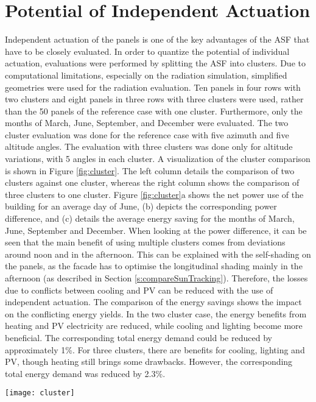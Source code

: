 \section{Potential of Independent Actuation}
	Independent actuation of the panels is one of the key advantages of the ASF that have to be closely evaluated. In order to quantize the potential of individual actuation, evaluations were performed by splitting the ASF into clusters. Due to computational limitations, especially on the radiation simulation, simplified geometries were used for the radiation evaluation. Ten panels in four rows with two clusters and eight panels in three rows with three clusters were used, rather than the 50 panels of the reference case with one cluster. Furthermore, only the months of March, June, September, and December were evaluated. The two cluster evaluation was done for the reference case with five azimuth and five altitude angles. The evaluation with three clusters was done only for altitude variations, with 5 angles in each cluster. A visualization of the cluster comparison is shown in Figure \ref{fig:cluster}. The left column details the comparison of two clusters against one cluster, whereas the right column shows the comparison of three clusters to one cluster. Figure \ref{fig:cluster}a shows the net power use of the building for an average day of June, (b) depicts the corresponding power difference, and (c) details the average energy saving for the months of March, June, September and December. When looking at the power difference, it can be seen that the main benefit of using multiple clusters comes from deviations around noon and in the afternoon. This can be explained with the self-shading on the panels, as the facade has to optimise the longitudinal shading mainly in the afternoon (as described in Section \ref{s:compareSunTracking}). Therefore, the losses due to conflicts between cooling and PV can be reduced with the use of independent actuation. The comparison of the energy savings shows the impact on the conflicting energy yields. In the two cluster case, the energy benefits from heating and PV electricity are reduced, while cooling and lighting become more beneficial. The corresponding total energy demand could be reduced by approximately 1\%. For three clusters, there are benefits for cooling, lighting and PV, though heating still brings some drawbacks. However, the corresponding total energy demand was reduced by 2.3\%.

	\begin{figure*}
		\begin{center}
		\texttt{[image: cluster]}
		\caption{Cluster analysis of the ASF. The left column details the analysis with 2 clusters, whereas the right column corresponds to the 3 cluster analysis. (a) shows the average power use per room area for the month of June, (b) details the corresponding power difference, and (c) visualizes the total energy savings, averaged for the months of March, June, September and December.}
		\label{fig:cluster}
		\end{center}
	\end{figure*}